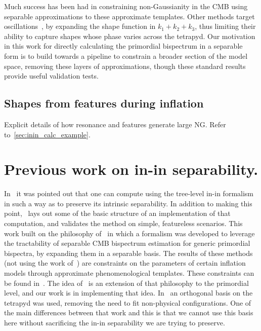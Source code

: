 Much success has been had in constraining non-Gaussianity
in the CMB using separable approximations to these approximate templates.
Other methods target oscillations~\cite{reso_estimator, excited_estimator},
by expanding the shape function
in $k_1+k_2+k_3$, thus limiting their ability to capture shapes whose
phase varies across the tetrapyd.
Our motivation in this work for directly calculating the primordial
bispectrum in a separable form is to build towards
a pipeline to constrain a broader section of the model space,
removing these layers of approximations,
though these standard results provide useful validation tests.
    \subsection{Shapes from features during inflation}
    Explicit details of how resonance and features generate large NG.
    Refer to~\ref{sec:inin_calc_example}.
\section{Previous work on in-in separability.}
    In~\cite{Funakoshi} it was pointed out that one can compute using the
tree-level in-in formalism in such a way as to preserve its intrinsic
separability. In addition to making this point,~\cite{Funakoshi} lays
out some of the basic structure of an implementation of that computation,
and validates the method on simple, featureless scenarios.
This work built on the philosophy of~\cite{FergShell_1,FergShell_2,FergShell_3}
in which a formalism was developed to
leverage the tractability of separable CMB bispectrum estimation
for generic primordial bispectra, by expanding them in a separable basis.
The results of these methods (not using the work of~\cite{Funakoshi})
are constraints on the parameters of certain inflation models through approximate
phenomenological templates.
These constraints can be found in~\cite{Planck_NG_2015, Planck_NG_2018}.
The idea of~\cite{Funakoshi} is an extension of that philosophy to the primordial level,
and our work is in implementing that idea.
In~\cite{FergShell_1,FergShell_2,FergShell_3} an orthogonal basis on the tetrapyd was used,
removing the need to fit non-physical configurations.
One of the main differences between that work and this
is that we cannot use this basis here without sacrificing the
in-in separability we are trying to preserve.

